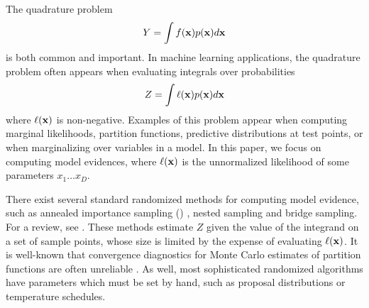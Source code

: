 \documentclass{article}
\begin{document}
The quadrature problem 
\begin{equation}\label{eq:Y}
Y = \int f(\vlfv) p(\vlfv) d\vlfv
\end{equation}
is both common and important.  In machine learning applications, the quadrature problem often appears when evaluating integrals over probabilities
\begin{equation}\label{eq:ev}
Z = \int \ell(\vlfv) p(\vlfv) d\vlfv
\end{equation}
where $\ell(\vlfv)$ is non-negative.  Examples of this problem appear when computing marginal likelihoods, partition functions, predictive distributions at test points, or when marginalizing over variables in a model.  In this paper, we focus on computing model evidences, where $\ell(\vlfv)$ is the unnormalized likelihood of some parameters $x_1 \dots x_D$.


There exist several standard randomized methods for computing model evidence, such as annealed importance sampling () \citep{neal2001annealed}, nested sampling \citep{skilling2004nested} and bridge sampling.  For a review, see \citet{chen2000monte}.   These methods estimate $Z$ given the value of the integrand on a set of sample points, whose size is limited by the expense of evaluating $\ell(\vlfv)$.  It is well-known that convergence diagnostics for Monte Carlo estimates of partition functions are often unreliable \citep{NealMC, brooks1998convergence, cowles1999possible}.  As well, most sophisticated randomized algorithms have parameters which must be set by hand, such as proposal distributions or temperature schedules.

\end{document}

